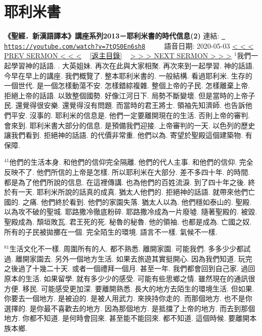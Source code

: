 \documentclass{book}
\begin{document}
\section{耶利米書}
\label{sec:7tQS0En6sh8}
\textbf{《聖經．新漢語譯本》講座系列2013－耶利米書的時代信息(2)}
\newline
\newline
連結: \href{https://youtube.com/watch?v=7tQS0En6sh8}{\texttt{ https://youtube.com/watch?v=7tQS0En6sh8}} ~~~~ 語音日期: 2020-05-03 
\newline
\newline
\hyperref[sec:WEwyO2xJwfc]{\small{< < < PREV SERMON < < <}}
~
\hyperref[sec:index]{\small{[返主目錄]}}
~
\hyperref[sec:VhiGoXEG1RY]{\small{> > > NEXT SERMON > > >}}
\newline
\newline
$^{1}$我們一起學習神的話語.
.
大英姐妹.
再次在此與大家相聚.
再次來到一起學習.
神的話語.
今早在早上的講座.
我們概覽了.
整本耶利米書的.
一般結構.
看過耶利米.
生存的一個世代.
是一個怎樣動蕩不安.
怎樣錯綜複雜.
整個上帝的子民.
怎樣離棄上帝.
拒絕上帝的話語.
以致整個國勢.
好像江河日下.
局勢不斷變壞.
但是當時的上帝子民.
還覺得很安樂.
還覺得沒有問題.
而當時的君王將士.
領袖先知濟師.
也告訴他們平安.
沒事的.
耶利米的信息是.
他們一定要離開現在的生活.
否則上帝的審判.
會來到.
耶利米書大部分的信息.
是預備我們迎接.
上帝審判的一天.
以色列的歷史讓我們看到.
拒絕神的話語.
的代價非常重.
他們以為.
寄望於聖殿這個建築物.
有保障.

$^{41}$他們的生活本身.
和他們的信仰完全隔離.
他們的代人主事.
和他們的信仰.
完全反映不了.
他們所信的上帝是怎樣.
所以耶利米在大部分.
差不多四十年.
的時間.
都是為了他們所說的信息.
在這裡傳講.
也為他們的百姓流淚.
到了四十年之後.
終於有一天.
耶利米所說的話真的成真.
猶太人他們的.
拒絕神的話語.
就帶來他們亡國的.
之痛.
他們終於看到.
他們的家園失落.
猶太人以為.
他們穩如泰山的.
聖殿.
以為攻不破的聖城.
耶路撒冷徹底粉碎.
耶路撒冷成為一片廢墟.
隨著聖殿的.
被毀.
聖殿成為.
頹垣敗瓦.
君王死的死.
秘魯的秘魯.
他的領袖.
也都是成為.
亡國之奴.
所有的子民被拋擲在一個.
完全陌生的環境.
語言不一樣.
氣候不一樣.

$^{81}$生活文化不一樣.
周圍所有的人.
都不熟悉.
離開家園.
可能我們.
多多少少都試過.
離開家園去.
另外一個地方生活.
如果去旅遊其實挺開心.
因為我們知道.
玩完之後過了十幾二十天.
或者一個禮拜一個月.
甚至一年.
我們都會回到自己家.
過回原本的生活.
如果留學.
就有多少少的感受.
可能有些思鄉之情.
雖然現在的通訊很方便.
移民.
可能感受更加深.
要離開熟悉.
長大的地方去陌生的環境生活.
但如果.
你要去一個地方.
是被迫的.
是被人用武力.
來挾持你走的.
而那個地方.
也不是你選擇的.
是你最不喜歡去的地方.
因為那個地方.
是抵擋了上帝的地方.
而去到那個地方.
你都不知道.
是何時會回來.
甚至能不能回來.
都不知道.
這個時候.
要離開本族本鄉.
\end{document}
